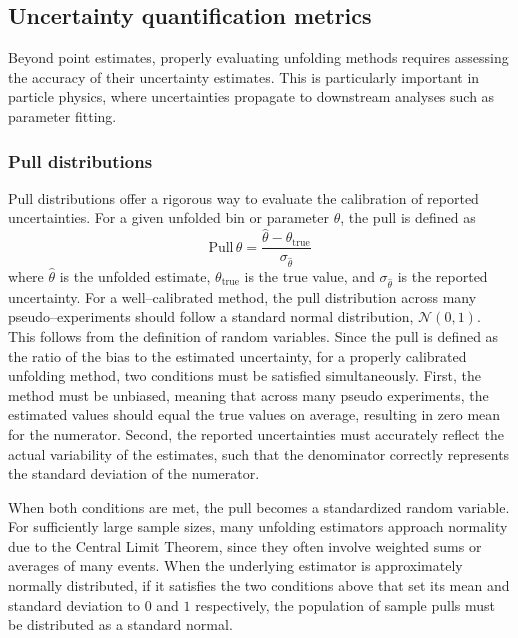         \subsection{Uncertainty quantification metrics}
        Beyond point estimates, properly evaluating unfolding methods requires assessing the accuracy of their uncertainty estimates. 
        This is particularly important in particle physics, where uncertainties propagate to downstream analyses such as parameter fitting.
        \subsubsection{Pull distributions}
        \label{subsubsec:pull-distributions}
            Pull distributions offer a rigorous way to evaluate the calibration of reported uncertainties.
            For a given unfolded bin or parameter \(\theta\), the pull is defined as
            \begin{equation}
                \text{Pull}\,{\theta} = \frac{\hat{\theta} - \theta_{\text{true}}}{\sigma_{\hat{\theta}}}
            \end{equation}
            where \(\hat{\theta}\) is the unfolded estimate, \(\theta_{\text{true}}\) is the true value, and \(\sigma_{\hat{\theta}}\) is the reported uncertainty.
            For a well--calibrated method, the pull distribution across many pseudo--experiments should follow a standard normal distribution, \(\mathcal{N}(0,1)\).
            This follows from the definition of random variables.
            Since the pull is defined as the ratio of the bias to the estimated uncertainty, for a properly calibrated unfolding method, two conditions must be satisfied simultaneously.
            First, the method must be unbiased, meaning that across many pseudo experiments, the estimated values should equal the true values on average, resulting in zero mean for the numerator.
            Second, the reported uncertainties must accurately reflect the actual variability of the estimates, such that the denominator correctly represents the standard deviation of the numerator.
            
            When both conditions are met, the pull becomes a standardized random variable.
            For sufficiently large sample sizes, many unfolding estimators approach normality due to the Central Limit Theorem, since they often involve weighted sums or averages of many events.
            When the underlying estimator is approximately normally distributed, if it satisfies the two conditions above that set its mean and standard deviation to \(0\) and \(1\) respectively, the population of sample pulls must be distributed as a standard normal.
            

